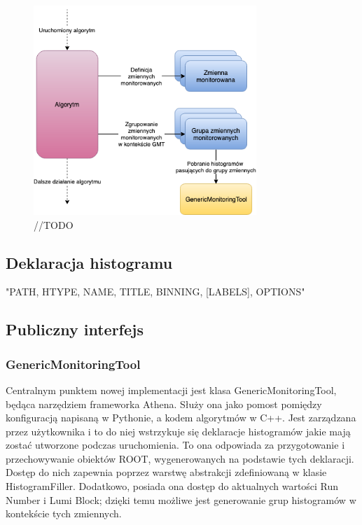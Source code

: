 \begin{figure}[!ht]
\centering
\includegraphics[width=0.75\textwidth]{img/algo_run.png}
\caption{
//TODO
}
\label{fig:athena:oldFlow}
\end{figure}

\subsection{Deklaracja histogramu}
"PATH, HTYPE, NAME, TITLE, BINNING, [LABELS], OPTIONS"

\subsection{Publiczny interfejs}

\subsubsection{GenericMonitoringTool}
Centralnym punktem nowej implementacji jest klasa GenericMonitoringTool, będąca narzędziem frameworka Athena.
Służy ona jako pomost pomiędzy konfiguracją napisaną w Pythonie, a kodem algorytmów w C++.
Jest zarządzana przez użytkownika i to do niej wstrzykuje się deklaracje histogramów jakie mają zostać utworzone podczas uruchomienia.
To ona odpowiada za przygotowanie i przechowywanie obiektów ROOT, wygenerowanych na podstawie tych deklaracji.
Dostęp do nich zapewnia poprzez warstwę abstrakcji zdefiniowaną w klasie HistogramFiller. 
Dodatkowo, posiada ona dostęp do aktualnych wartości Run Number i Lumi Block; dzięki temu możliwe jest generowanie grup histogramów w kontekście tych zmiennych. 
 
